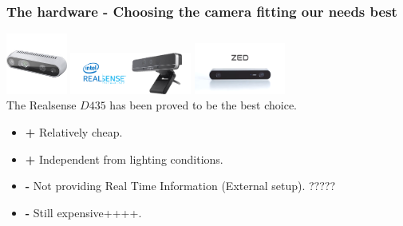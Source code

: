 \documentclass{beamer}
\begin{document}
\begin{frame}
\frametitle{The hardware - Choosing the camera fitting our needs best} %


\includegraphics[width = 2cm]{Figures/Realsense1}
\includegraphics[width = 4cm]{Figures/intel2} \hspace{1cm}
\includegraphics[width = 3cm]{Figures/ZED} \hspace{2cm}
\\ %
The Realsense $D435$ has been proved to be the best choice.
\begin{itemize}
	\item \textbf{+ } Relatively cheap.
	
	\item \textbf{+ } Independent from lighting conditions. 
	
	\item \textbf{- } Not providing Real Time Information (External setup). ????? 
	
	\item \textbf{- } Still expensive++++.	
\end{itemize}




\end{frame}
\end{document}
